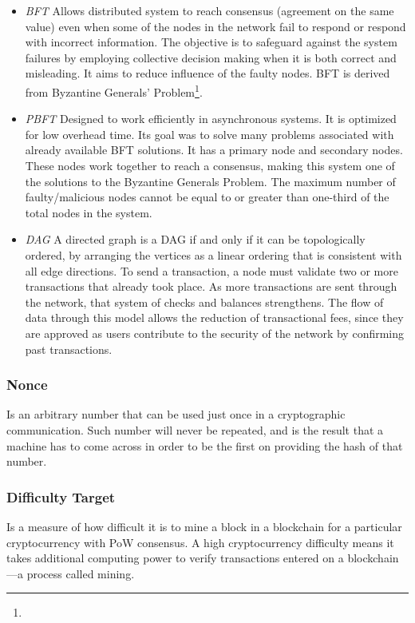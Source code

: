 \begin{itemize}
    \item \emph{\ac{BFT}}
    Allows distributed system to reach consensus (agreement on the same value) even when some of the nodes in the network fail to respond or respond with incorrect information. The objective is to safeguard against the system failures by employing collective decision making when it is both correct and misleading. It aims to reduce influence of the faulty nodes. \ac{BFT} is derived from Byzantine Generals’ Problem\footnote{}.
    
    
    \item \emph{\ac{PBFT}}
    Designed to work efficiently in asynchronous systems. It is optimized for low overhead time. Its goal was to solve many problems associated with already available \ac{BFT} solutions. It has a primary node and secondary nodes. These nodes work together to reach a consensus, making this system one of the solutions to the Byzantine Generals Problem. The maximum number of faulty/malicious nodes cannot be equal to or greater than one-third of the total nodes in the system.

    \item \emph{\ac{DAG}}
    A directed graph is a \ac{DAG} if and only if it can be topologically ordered, by arranging the vertices as a linear ordering that is consistent with all edge directions. To send a transaction, a node must validate two or more transactions that already took place. As more transactions are sent through the network, that system of checks and balances strengthens. The flow of data through this model allows the reduction of transactional fees, since they are approved as users contribute to the security of the network by confirming past transactions.

\end{itemize}


\subsubsection{\ac{Nonce}}
Is an arbitrary number that can be used just once in a cryptographic communication. Such number will never be repeated, and is the result that a machine has to come across in order to be the first on providing the hash of that number.

\subsubsection{Difficulty Target}
Is a measure of how difficult it is to mine a block in a blockchain for a particular cryptocurrency with \ac{PoW} consensus. A high cryptocurrency difficulty means it takes additional computing power to verify transactions entered on a blockchain—a process called mining.
